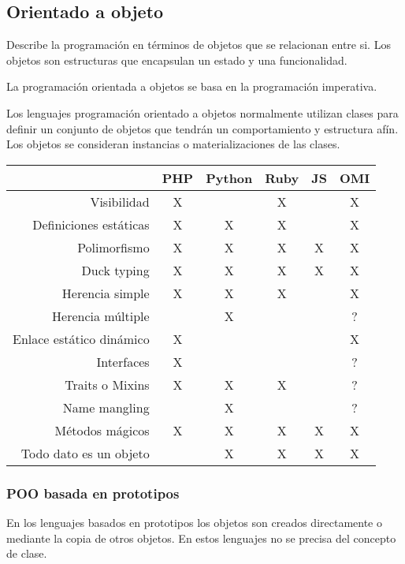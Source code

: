 \subsection{Orientado a objeto}
Describe la programación en términos de objetos que se relacionan entre si. Los objetos son 
estructuras que encapsulan un estado y una funcionalidad. 

La programación orientada a objetos se basa en la programación imperativa.

Los lenguajes programación orientado a objetos normalmente utilizan clases 
para definir un conjunto de objetos que tendrán un comportamiento y estructura afín. 
Los objetos se consideran instancias o materializaciones de las clases.


\FloatBarrier
\begin{table}[h]
\begin{center}
 
\begin{tabular}{|r|c|c|c|c|c|} \hline
 & PHP  & Python & Ruby & JS & OMI\\ \hline
Visibilidad & X &  & X &  & X \\ \hline
Definiciones estáticas & X & X & X &  & X \\ \hline
Polimorfismo & X & X & X & X & X \\ \hline
Duck typing & X & X & X & X & X \\ \hline
Herencia simple  & X & X & X &  & X \\ \hline
Herencia múltiple  &  & X &  &  & ? \\ \hline
Enlace estático dinámico & X &  &  &  &  X \\ \hline
Interfaces & X &  &  &  &  ? \\ \hline
Traits o Mixins & X & X & X &  &  ? \\ \hline
Name mangling & & X & & & ? \\ \hline
Métodos mágicos & X & X & X & X & X \\ \hline 
Todo dato es un objeto  &  & X & X & X & X \\ \hline 
\end{tabular}
\end{center}
\end{table}
\FloatBarrier

\subsubsection{POO basada en prototipos}

En los lenguajes basados en prototipos los objetos son creados directamente o mediante
la copia de otros objetos. En estos lenguajes no se precisa del concepto de clase.


